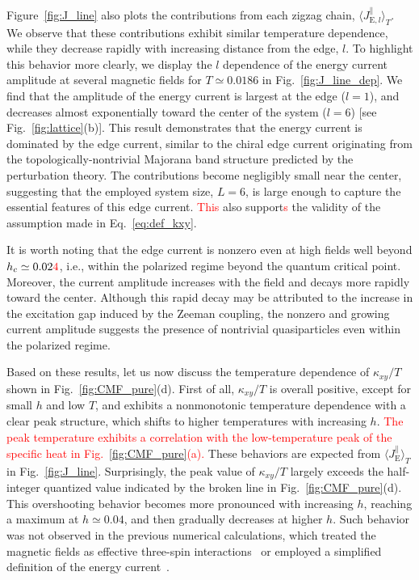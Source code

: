 \documentclass[twocolumn,superscriptaddress,showpacs, longbibliography, aps, prx]{revtex4-2}
\newcommand{\red}[1]{\textcolor{red}{#1}}
\begin{document}
Figure~\ref{fig:J_line} also plots the contributions from each zigzag chain, $\langle J_{\mathrm{E},l}^\parallel \rangle_T$. 
We observe that these contributions exhibit similar temperature dependence, while they decrease rapidly with increasing distance from the edge, $l$. 
To highlight this behavior more clearly, we display the $l$ dependence of the energy current amplitude at several magnetic fields for $T\simeq 0.0186$ in Fig.~\ref{fig:J_line_dep}. 
We find that the amplitude of the energy current is largest at the edge ($l=1$), and decreases almost exponentially toward the center of the system ($l=6$) [see Fig.~\ref{fig:lattice}(b)]. 
This result demonstrates that the energy current is dominated by the edge current, similar to the chiral edge current originating from the topologically-nontrivial Majorana band structure predicted by the perturbation theory.
The contributions become negligibly small near the center, suggesting that the employed system size, $L=6$, is large enough to capture the essential features of this edge current.
\red{This} also support\red{s} %
the validity of the assumption made in Eq.~\eqref{eq:def_kxy}. 

It is worth noting that the edge current is nonzero even at high fields well beyond $h_c \simeq 0.02\red{4}$, i.e., within the polarized regime beyond the quantum critical point. 
Moreover, the current amplitude increases with the field and decays more rapidly toward the center. 
Although this rapid decay may be attributed to the increase in the excitation gap induced by the Zeeman coupling, the nonzero and growing current amplitude suggests the presence of nontrivial quasiparticles even within the polarized regime.

Based on these results, let us now discuss the temperature dependence of $\kappa_{xy}/T$ shown in Fig.~\ref{fig:CMF_pure}(d). First of all, $\kappa_{xy}/T$ is overall positive, except for small $h$ and low $T$, and exhibits a nonmonotonic temperature dependence with a clear peak structure, which shifts to higher temperatures with increasing $h$. 
\red{The peak temperature exhibits a correlation with the low-temperature peak of the specific heat in Fig.~\ref{fig:CMF_pure}(a).}
These behaviors are expected from $\langle J_{\mathrm{E}}^\parallel \rangle_T$ in Fig.~\ref{fig:J_line}. 
Surprisingly, the peak value of $\kappa_{xy}/T$ largely exceeds the half-integer quantized value indicated by the broken line in Fig.~\ref{fig:CMF_pure}(d). 
This overshooting behavior becomes more pronounced with increasing $h$, reaching a maximum at $h\simeq 0.04$, and then gradually decreases at higher $h$. 
Such behavior was not observed in the previous numerical calculations, which treated the magnetic fields as effective three-spin interactions~\cite{NasuYM2017} or employed a simplified definition of the energy current~\cite{KumarT2023}. 
\end{document}
